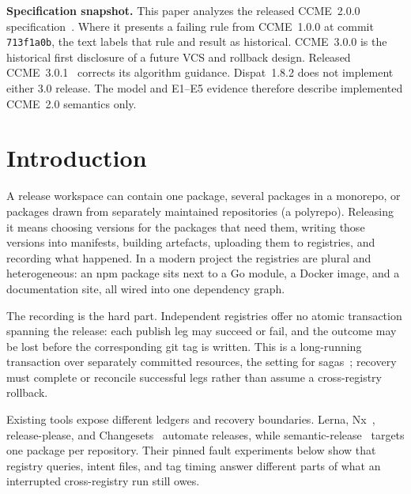 \documentclass[sigconf,nonacm]{acmart}
\newcommand{\code}[1]{\texttt{#1}}
\begin{document}

\maketitle

\noindent\textbf{Specification snapshot.} This paper analyzes the released
CCME~2.0.0 specification~\cite{ccme2}. Where it presents a failing rule from CCME~1.0.0 at
commit \code{713f1a0b}, the text labels that rule and result as historical.
CCME~3.0.0 is the historical first disclosure of a future VCS and rollback
design. Released CCME~3.0.1~\cite{ccme301} corrects its algorithm guidance.
Dispat~1.8.2 does
not implement either 3.0 release. The model and E1--E5 evidence therefore
describe implemented CCME~2.0 semantics only.

\section{Introduction}
\label{sec:intro}

A release workspace can contain one package, several packages in a monorepo,
or packages drawn from separately maintained repositories (a polyrepo).
Releasing it means choosing versions for the packages that need them,
writing those versions into manifests, building artefacts,
uploading them to registries, and recording what happened. In a modern
project the registries are plural and heterogeneous: an npm package sits
next to a Go module, a Docker image, and a documentation site, all wired
into one dependency graph.

The recording is the hard part. Independent registries offer no atomic
transaction spanning the release: each publish leg may succeed or fail, and
the outcome may be lost before the corresponding git tag is written. This is
a long-running transaction over separately committed resources, the setting
for sagas~\cite{sagas}; recovery must complete or reconcile successful legs
rather than assume a cross-registry rollback.

Existing tools expose different ledgers and recovery boundaries. Lerna,
Nx~\cite{nx}, release-please, and Changesets~\cite{changesets} automate
releases, while semantic-release~\cite{semanticrelease} targets one package
per repository. Their pinned fault experiments below show that registry
queries, intent files, and tag timing answer different parts of what an
interrupted cross-registry run still owes.
\end{document}
